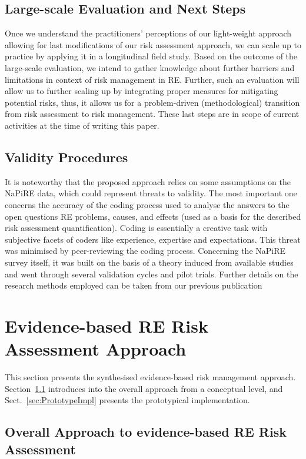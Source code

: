 \documentclass[lnbip]{svmultln}
\begin{document}
\subsection{Large-scale Evaluation and Next Steps}
Once we understand the practitioners' perceptions of our light-weight approach allowing for last modifications of our risk assessment approach, we can scale up to practice by applying it in a longitudinal field study. Based on the outcome of the large-scale evaluation, we intend to gather knowledge about further barriers and limitations in context of risk management in RE. Further, such an evaluation will allow us to further scaling up by integrating proper measures for mitigating potential risks, thus, it allows us for a problem-driven (methodological) transition from risk assessment to risk management. These last steps are in scope of current activities at the time of writing this paper. 

\subsection{Validity Procedures}
It is noteworthy that the proposed approach relies on some assumptions on the NaPiRE data, which could represent threats to validity. The most important one concerns the accuracy of the coding process used to analyse the answers to the open questions RE problems, causes, and effects (used as a basis for the described risk assessment quantification). Coding is essentially a creative task with subjective facets of coders like experience, expertise and expectations. This threat was minimised by peer-reviewing the coding process. Concerning the NaPiRE survey itself, it was built on the basis of a theory induced from available studies and went through several validation cycles and pilot trials. Further details on the research methods employed can be taken from our previous publication~\cite{MW+16}


\section{Evidence-based RE Risk Assessment Approach}
\label{sec:EbRE}
This section presents the synthesised evidence-based risk management approach. Section~\ref{sec:OVerallConcept} introduces into the overall approach from a conceptual level, and Sect.~\ref{sec:PrototypeImpl} presents the prototypical implementation.

\subsection{Overall Approach to evidence-based RE Risk Assessment}
\label{sec:OVerallConcept}
\end{document}
